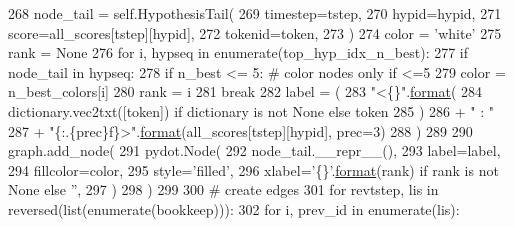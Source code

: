 \begin{DoxyCode}
268                 node\_tail = self.HypothesisTail(
269                     timestep=tstep,
270                     hypid=hypid,
271                     score=all\_scores[tstep][hypid],
272                     tokenid=token,
273                 )
274                 color = \textcolor{stringliteral}{'white'}
275                 rank = \textcolor{keywordtype}{None}
276                 \textcolor{keywordflow}{for} i, hypseq \textcolor{keywordflow}{in} enumerate(top\_hyp\_idx\_n\_best):
277                     \textcolor{keywordflow}{if} node\_tail \textcolor{keywordflow}{in} hypseq:
278                         \textcolor{keywordflow}{if} n\_best <= 5:  \textcolor{comment}{# color nodes only if <=5}
279                             color = n\_best\_colors[i]
280                         rank = i
281                         \textcolor{keywordflow}{break}
282                 label = (
283                     \textcolor{stringliteral}{"<\{\}"}.\hyperlink{namespaceparlai_1_1chat__service_1_1services_1_1messenger_1_1shared__utils_a32e2e2022b824fbaf80c747160b52a76}{format}(
284                         dictionary.vec2txt([token]) \textcolor{keywordflow}{if} dictionary \textcolor{keywordflow}{is} \textcolor{keywordflow}{not} \textcolor{keywordtype}{None} \textcolor{keywordflow}{else} token
285                     )
286                     + \textcolor{stringliteral}{" : "}
287                     + \textcolor{stringliteral}{"\{:.\{prec\}f\}>"}.\hyperlink{namespaceparlai_1_1chat__service_1_1services_1_1messenger_1_1shared__utils_a32e2e2022b824fbaf80c747160b52a76}{format}(all\_scores[tstep][hypid], prec=3)
288                 )
289 
290                 graph.add\_node(
291                     pydot.Node(
292                         node\_tail.\_\_repr\_\_(),
293                         label=label,
294                         fillcolor=color,
295                         style=\textcolor{stringliteral}{'filled'},
296                         xlabel=\textcolor{stringliteral}{'\{\}'}.\hyperlink{namespaceparlai_1_1chat__service_1_1services_1_1messenger_1_1shared__utils_a32e2e2022b824fbaf80c747160b52a76}{format}(rank) \textcolor{keywordflow}{if} rank \textcolor{keywordflow}{is} \textcolor{keywordflow}{not} \textcolor{keywordtype}{None} \textcolor{keywordflow}{else} \textcolor{stringliteral}{''},
297                     )
298                 )
299 
300         \textcolor{comment}{# create edges}
301         \textcolor{keywordflow}{for} revtstep, lis \textcolor{keywordflow}{in} reversed(list(enumerate(bookkeep))):
302             \textcolor{keywordflow}{for} i, prev\_id \textcolor{keywordflow}{in} enumerate(lis):

\end{DoxyCode}
